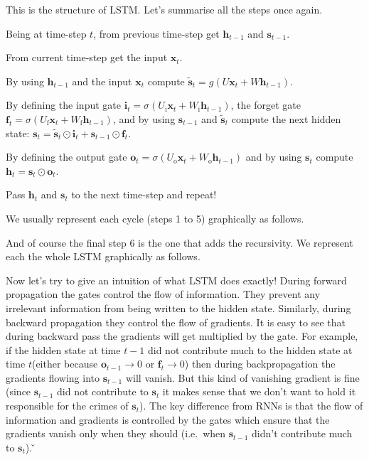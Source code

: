 This is the structure of LSTM. Let's summarise all the steps once again.
\ben
\item Being at time-step $t$, from previous time-step get $\boldsymbol{h}_{t-1}$ and $\boldsymbol{s}_{t-1}$.
\item From current time-step get the input $\boldsymbol{x}_{t}$.
\item By using $\boldsymbol{h}_{t-1}$ and the input $\boldsymbol{x}_{t}$ compute $\boldsymbol{\tilde{s}}_t = g
(U\boldsymbol{x}_t + W \boldsymbol{h}_{t-1})$.
\item By defining the input gate $\boldsymbol{i}_{t} = \sigma(U_{\text{i}} \boldsymbol{x}_{t} + W_{\text{i}}
\boldsymbol{h}_{t-1})$, the forget gate $\boldsymbol{f}_{t} = \sigma (U_{\text{f}} \boldsymbol{x}_{t} +
W_{\text{f}} \boldsymbol{h}_{t-1})$, and by using $\boldsymbol{s}_{t-1}$ and $\boldsymbol{\tilde{s}}_t$ compute the
next hidden state: $\boldsymbol{s}_{t} =\boldsymbol{\tilde{s}}_t\odot \boldsymbol{i}_{t} + \boldsymbol{s}_{t-1} \odot
\boldsymbol{f}_{t}$.
\item By defining the output gate $\boldsymbol{o}_{t} = \sigma (U_{\text{o}} \boldsymbol{x}_{t} + W_{\text{o}}
\boldsymbol{h}_{t-1})$ and by using $\boldsymbol{s}_{t}$ compute $\boldsymbol{h}_{t} = \boldsymbol{s}_{t} \odot
\boldsymbol{o}_{t}$.
\item Pass $\boldsymbol{h}_{t}$ and $\boldsymbol{s}_{t}$ to the next time-step and repeat!
\een

We usually represent each cycle (steps 1 to 5) graphically as follows.


And of course the final step 6 is the one that adds the recursivity. We represent each the whole LSTM graphically as
follows.


Now let's try to give an intuition of what LSTM does exactly! During forward propagation the gates control the flow
of information. They prevent any irrelevant information from being written to the hidden state. Similarly, during
backward propagation they control the flow of gradients. It is easy to see that during backward pass the gradients will
get multiplied by the gate. For example, if the hidden state at time $t - 1$ did not contribute much to the hidden state
at time $t$(either because $\boldsymbol{o}_{t-1} \to 0$ or $\boldsymbol{f}_{t} \to 0$) then during backpropagation the
gradients flowing into
$\boldsymbol{s}_{t-1}$ will vanish. But this kind of vanishing gradient is fine (since $\boldsymbol{s}_{t-1}$ did not
contribute to $\boldsymbol{s}_{t}$ it
makes sense that we don't want to hold it responsible for the crimes of $\boldsymbol{s}_{t}$). The key difference from
RNNs is that
the flow of information and gradients is controlled by the gates which ensure that the gradients vanish only when they
should (i.e.\ when $\boldsymbol{s}_{t-1}$ didn't contribute much to $\boldsymbol{s}_{t}$). \v

